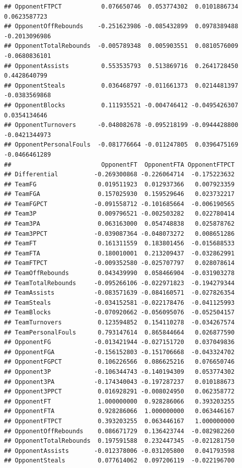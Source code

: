 \documentclass[
]{book}
\begin{document}
\begin{verbatim}
## OpponentFTPCT           0.076650746  0.053774302  0.0101886734  0.0623587723
## OpponentOffRebounds    -0.251623986 -0.085432899  0.0978389488 -0.2013096986
## OpponentTotalRebounds  -0.005789348  0.005903551  0.0810576009 -0.0680836101
## OpponentAssists         0.553535793  0.513869716  0.2641728450  0.4428640799
## OpponentSteals          0.036468797 -0.011661373  0.0214481397 -0.0383569868
## OpponentBlocks          0.111935521 -0.004746412 -0.0495426307  0.0354134646
## OpponentTurnovers      -0.048082678 -0.095218199 -0.0944428800 -0.0421344973
## OpponentPersonalFouls  -0.081776664 -0.011247805  0.0396475169 -0.0466461289
##                         OpponentFT  OpponentFTA OpponentFTPCT
## Differential          -0.269300868 -0.226064714  -0.175223632
## TeamFG                 0.019511923  0.012937366   0.007923359
## TeamFGA                0.157025930  0.159529646   0.023732217
## TeamFGPCT             -0.091558712 -0.101685664  -0.006190565
## Team3P                 0.009796521 -0.002503282   0.022780414
## Team3PA                0.063163000  0.054748838   0.025878762
## Team3PPCT             -0.039087364 -0.048073272   0.008651286
## TeamFT                 0.161311559  0.183801456  -0.015688533
## TeamFTA                0.180010001  0.213209437  -0.032862991
## TeamFTPCT             -0.009352580 -0.025707797   0.028078614
## TeamOffRebounds        0.043439990  0.058466904  -0.031903278
## TeamTotalRebounds     -0.095266106 -0.022971823  -0.194279344
## TeamAssists           -0.083571639 -0.084160571  -0.027826354
## TeamSteals            -0.034152581 -0.022178476  -0.041125993
## TeamBlocks            -0.070920662 -0.056095076  -0.052504157
## TeamTurnovers          0.123594852  0.154110278  -0.034267574
## TeamPersonalFouls      0.793147614  0.865844664   0.026877590
## OpponentFG            -0.013421944 -0.027151720   0.037049836
## OpponentFGA           -0.156152803 -0.151706668  -0.043324702
## OpponentFGPCT          0.106226566  0.086625216   0.076650746
## Opponent3P            -0.106344743 -0.140194309   0.053774302
## Opponent3PA           -0.174340043 -0.197287237   0.010188673
## Opponent3PPCT          0.016928291 -0.008024950   0.062358772
## OpponentFT             1.000000000  0.928286066   0.393203255
## OpponentFTA            0.928286066  1.000000000   0.063446167
## OpponentFTPCT          0.393203255  0.063446167   1.000000000
## OpponentOffRebounds    0.086671729  0.136423744  -0.082982260
## OpponentTotalRebounds  0.197591588  0.232447345  -0.021281750
## OpponentAssists       -0.012378006 -0.031205800   0.041793598
## OpponentSteals         0.077614062  0.097206119  -0.022196700

\end{verbatim}
\end{document}
